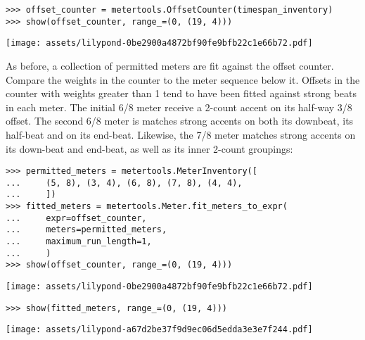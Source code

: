 \begin{abjadbookoutput}
\begin{singlespacing}
\vspace{-0.5\baselineskip}
\begin{verbatim}
>>> offset_counter = metertools.OffsetCounter(timespan_inventory)
>>> show(offset_counter, range_=(0, (19, 4)))
\end{verbatim}
\noindent\texttt{[image: assets/lilypond-0be2900a4872bf90fe9bfb22c1e66b72.pdf]}
\end{singlespacing}
\end{abjadbookoutput}

\noindent As before, a collection of permitted meters are fit against the
offset counter. Compare the weights in the counter to the meter sequence below
it. Offsets in the counter with weights greater than 1 tend to have been fitted
against strong beats in each meter. The initial 6/8 meter receive a 2-count
accent on its half-way 3/8 offset. The second 6/8 meter is matches strong
accents on both its downbeat, its half-beat and on its end-beat. Likewise, the
7/8 meter matches strong accents on its down-beat and end-beat, as well as its
inner 2-count groupings:

\begin{comment}
<abjad>
permitted_meters = metertools.MeterInventory([
    (5, 8), (3, 4), (6, 8), (7, 8), (4, 4),
    ])
fitted_meters = metertools.Meter.fit_meters_to_expr(
    expr=offset_counter,
    meters=permitted_meters,
    maximum_run_length=1,
    )
show(offset_counter, range_=(0, (19, 4)))
show(fitted_meters, range_=(0, (19, 4)))
</abjad>
\end{comment}

\begin{abjadbookoutput}
\begin{singlespacing}
\vspace{-0.5\baselineskip}
\begin{verbatim}
>>> permitted_meters = metertools.MeterInventory([
...     (5, 8), (3, 4), (6, 8), (7, 8), (4, 4),
...     ])
>>> fitted_meters = metertools.Meter.fit_meters_to_expr(
...     expr=offset_counter,
...     meters=permitted_meters,
...     maximum_run_length=1,
...     )
>>> show(offset_counter, range_=(0, (19, 4)))
\end{verbatim}
\noindent\texttt{[image: assets/lilypond-0be2900a4872bf90fe9bfb22c1e66b72.pdf]}
\begin{verbatim}
>>> show(fitted_meters, range_=(0, (19, 4)))
\end{verbatim}
\noindent\texttt{[image: assets/lilypond-a67d2be37f9d9ec06d5edda3e3e7f244.pdf]}
\end{singlespacing}
\end{abjadbookoutput}


